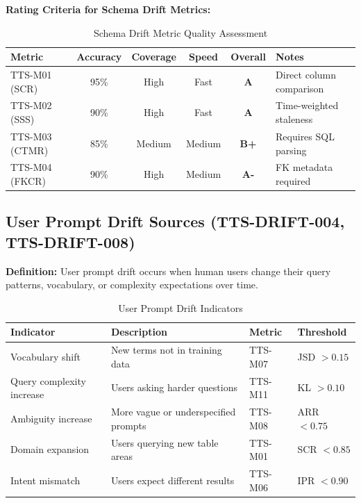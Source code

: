\textbf{Rating Criteria for Schema Drift Metrics:}

\begin{table}[htbp]
\centering
\footnotesize
\caption{Schema Drift Metric Quality Assessment}
\label{tab:schema-metric-rating}
\begin{tabularx}{\textwidth}{@{}l c c c c X@{}}
\toprule
\textbf{Metric} & \textbf{Accuracy} & \textbf{Coverage} & \textbf{Speed} & \textbf{Overall} & \textbf{Notes} \\
\midrule
TTS-M01 (SCR) & 95\% & High & Fast & \textbf{A} & Direct column comparison \\
TTS-M02 (SSS) & 90\% & High & Fast & \textbf{A} & Time-weighted staleness \\
TTS-M03 (CTMR) & 85\% & Medium & Medium & \textbf{B+} & Requires SQL parsing \\
TTS-M04 (FKCR) & 90\% & High & Medium & \textbf{A-} & FK metadata required \\
\bottomrule
\end{tabularx}
\end{table}

\subsection{User Prompt Drift Sources (TTS-DRIFT-004, TTS-DRIFT-008)}

\textbf{Definition:} User prompt drift occurs when human users change their
query patterns, vocabulary, or complexity expectations over time.

\begin{table}[htbp]
\centering
\footnotesize
\caption{User Prompt Drift Indicators}
\label{tab:user-drift-indicators}
\begin{tabularx}{\textwidth}{@{}l X l l@{}}
\toprule
\textbf{Indicator} & \textbf{Description} & \textbf{Metric} & \textbf{Threshold} \\
\midrule
Vocabulary shift & New terms not in training data & TTS-M07 & JSD $> 0.15$ \\
Query complexity increase & Users asking harder questions & TTS-M11 & KL $> 0.10$ \\
Ambiguity increase & More vague or underspecified prompts & TTS-M08 & ARR $< 0.75$ \\
Domain expansion & Users querying new table areas & TTS-M01 & SCR $< 0.85$ \\
Intent mismatch & Users expect different results & TTS-M06 & IPR $< 0.90$ \\
\bottomrule
\end{tabularx}
\end{table}

